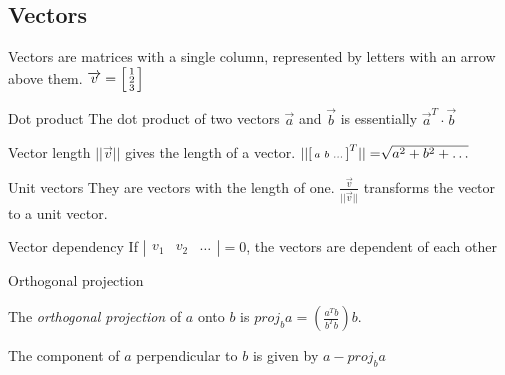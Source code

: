 \documentclass{article}
\begin{document}
\subsection{Vectors}
Vectors are matrices with a single column, represented by letters with an arrow above them. $\overrightarrow{v} = \begin{bsmallmatrix}
        1\\2\\3
    \end{bsmallmatrix}$

\begin{knBox}[]{Dot product}
    The dot product of two vectors $\vec{a}$ and $\vec{b}$ is essentially $\vec{a}^T\cdot\vec{b}$
\end{knBox}
\begin{knBox}[]{Vector length}
    $||\vec{v}||$ gives the length of a vector. $||\begin{bsmallmatrix}
            a&b&\dots
        \end{bsmallmatrix}^T||=\sqrt[]{a^2 + b^2 + \dots}$
\end{knBox}
\begin{knBox}[]{Unit vectors}
    They are vectors with the length of one. $\frac{\vec{v}}{||\vec{v}||}$ transforms the vector to a unit vector.
\end{knBox}
\begin{definition}[]{Vector dependency}
    If $|\begin{smallmatrix}
            v_1 & v_2 & \dots
        \end{smallmatrix}|=0$, the vectors are dependent of each other
\end{definition}
\label{sec:dep}
\begin{knBox}[]{Orthogonal projection}

    \begin{minipage}{0.6\textwidth}
        The \emph{orthogonal projection} of $a$ onto $b$ is $proj_ba = (\frac{a^Tb}{b^Tb})b$.

        The component of $a$ perpendicular to $b$ is given by $a-proj_ba$
    \end{minipage}
    \hfill
    \begin{minipage}{0.35\textwidth}
    \end{minipage}

\end{knBox}
\end{document}
